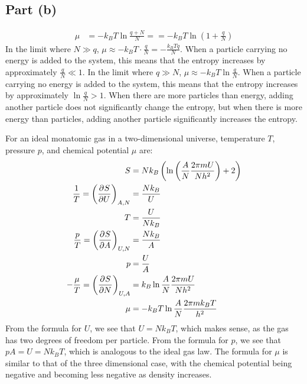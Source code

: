 \documentclass{article}
\begin{document}
\subsection*{Part (b)}
\begin{equation}
    \begin{split}
        \mu & = -k_B T\ln\frac{q + N}{N} = = -k_B T\ln(1 + \frac{q}{N})
    \end{split}
\end{equation}
In the limit where $N \gg q$, $\mu \approx -k_B T \cdot \frac{q}{N} = -\frac{k_B Tq}{N}$. When a particle carrying no energy is added to the system, this means that the entropy increases by approximately $\frac{q}{N} \ll 1$. In the limit where $q \gg N$, $\mu \approx -k_B T\ln\frac{q}{N}$. When a particle carrying no energy is added to the system, this means that the entropy increases by approximately $\ln\frac{q}{N} > 1$. When there are more particles than energy, adding another particle does not significantly change the entropy, but when there is more energy than particles, adding another particle significantly increases the entropy.

\clearpage

For an ideal monatomic gas in a two-dimensional universe, temperature $T$, pressure $p$, and chemical potential $\mu$ are:
\begin{equation}
    \begin{split}
        S & = Nk_B\left(\ln\left(\frac{A}{N}\frac{2\pi mU}{Nh^{2}}\right) + 2\right) \\
        \frac{1}{T} = {\left(\frac{\partial^{}S} {\partial U^{}}\right)}_{A,N} & = \frac{Nk_B}{U} \\
        T & = \frac{U}{Nk_B} \\
        \frac{p}{T} = {\left(\frac{\partial^{}S} {\partial A^{}}\right)}_{U,N} & = \frac{Nk_B}{A} \\
        p & = \frac{U}{A} \\
        -\frac{\mu}{T} = {\left(\frac{\partial^{}S} {\partial N^{}}\right)}_{U,A} & = k_B\ln\frac{A}{N}\frac{2\pi mU}{Nh^{2}} \\
        \mu & = -k_B T\ln\frac{A}{N}\frac{2\pi mk_B T}{h^{2}} \\
    \end{split}
\end{equation}
From the formula for $U$, we see that $U = Nk_B T$, which makes sense, as the gas has two degrees of freedom per particle. From the formula for $p$, we see that $pA = U = Nk_B T$, which is analogous to the ideal gas law. The formula for $\mu$ is similar to that of the three dimensional case, with the chemical potential being negative and becoming less negative as density increases.
\end{document}
